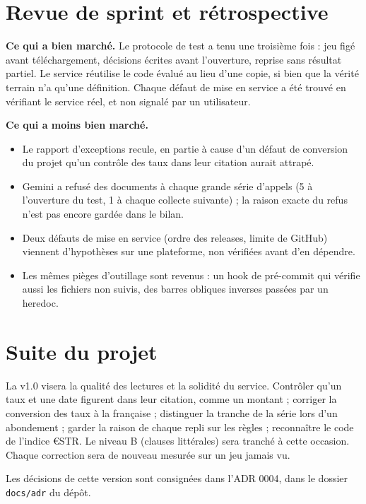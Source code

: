 \documentclass[11pt,a4paper]{article}
\begin{document}

\section{Revue de sprint et rétrospective}

\textbf{Ce qui a bien marché.} Le protocole de test a tenu une troisième fois : jeu figé avant téléchargement, décisions écrites avant l'ouverture, reprise sans résultat partiel. Le service réutilise le code évalué au lieu d'une copie, si bien que la vérité terrain n'a qu'une définition. Chaque défaut de mise en service a été trouvé en vérifiant le service réel, et non signalé par un utilisateur.

\textbf{Ce qui a moins bien marché.}
\begin{itemize}
  \item Le rapport d'exceptions recule, en partie à cause d'un défaut de conversion du projet qu'un contrôle des taux dans leur citation aurait attrapé.
  \item Gemini a refusé des documents à chaque grande série d'appels (5 à l'ouverture du test, 1 à chaque collecte suivante) ; la raison exacte du refus n'est pas encore gardée dans le bilan.
  \item Deux défauts de mise en service (ordre des releases, limite de GitHub) viennent d'hypothèses sur une plateforme, non vérifiées avant d'en dépendre.
  \item Les mêmes pièges d'outillage sont revenus : un hook de pré-commit qui vérifie aussi les fichiers non suivis, des barres obliques inverses passées par un heredoc.
\end{itemize}

\section{Suite du projet}

La v1.0 visera la qualité des lectures et la solidité du service. Contrôler qu'un taux et une date figurent dans leur citation, comme un montant ; corriger la conversion des taux à la française ; distinguer la tranche de la série lors d'un abondement ; garder la raison de chaque repli sur les règles ; reconnaître le code de l'indice €STR. Le niveau B (clauses littérales) sera tranché à cette occasion. Chaque correction sera de nouveau mesurée sur un jeu jamais vu.

Les décisions de cette version sont consignées dans l'ADR 0004, dans le dossier \texttt{docs/adr} du dépôt.
\end{document}
